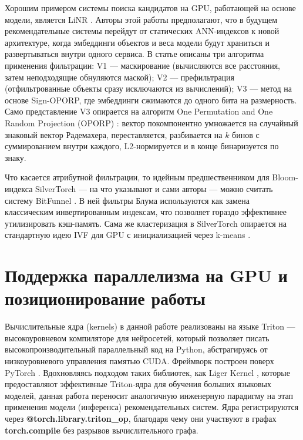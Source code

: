 \documentclass[14pt,a4paper]{extreport}
\numberwithin{figure}{chapter}
\numberwithin{table}{chapter}
\numberwithin{equation}{chapter}
\begin{document}
Хорошим примером системы поиска кандидатов на GPU, работающей на основе модели, является LiNR \cite{borisyuk2024linr}. Авторы этой работы предполагают, что в будущем рекомендательные системы перейдут от статических ANN-индексов к новой архитектуре, когда эмбеддинги объектов и веса модели будут храниться и развертываться внутри одного сервиса. В статье описаны три алгоритма применения фильтрации: V1 --- маскирование (вычисляются все расстояния, затем неподходящие обнуляются маской); V2 --- префильтрация (отфильтрованные объекты сразу исключаются из вычислений); V3 --- метод на основе Sign-OPORP, где эмбеддинги сжимаются до одного бита на размерность. Само представление V3 опирается на алгоритм One Permutation and One Random Projection (OPORP) \cite{li2023oporp}: вектор покомпонентно умножается на случайный знаковый вектор Радемахера, переставляется, разбивается на $k$ бинов с суммированием внутри каждого, L2-нормируется и в конце бинаризуется по знаку.

Что касается атрибутной фильтрации, то идейным предшественником для Bloom-индекса SilverTorch --- на что указывают и сами авторы \cite{xue2025silvertorch} --- можно считать систему BitFunnel \cite{goodwin2017bitfunnel}. В ней фильтры Блума \cite{bloom1970space} используются как замена классическим инвертированным индексам, что позволяет гораздо эффективнее утилизировать кэш-память. Сама же кластеризация в SilverTorch опирается на стандартную идею IVF для GPU с инициализацией через k-means \cite{lloyd1982least}.

\section{Поддержка параллелизма на GPU и позиционирование работы}

Вычислительные ядра (kernels) в данной работе реализованы на языке Triton \cite{tillet2019triton} --- высокоуровневом компиляторе для 
нейросетей, который позволяет писать высокопроизводительный параллельный код на Python, абстрагируясь от 
низкоуровневого управления памятью CUDA. Фреймворк построен поверх PyTorch \cite{pytorch_docs}. Вдохновляясь 
подходом таких библиотек, как Liger Kernel \cite{hsu2024liger}, которые предоставляют эффективные Triton-ядра для 
обучения больших языковых моделей, данная работа переносит аналогичную инженерную парадигму на этап применения модели 
(инференса) рекомендательных систем. Ядра регистрируются через \textbf{@torch.library.triton\_op}, благодаря 
чему они участвуют в графах \textbf{torch.compile} без разрывов вычислительного графа.
\end{document}
